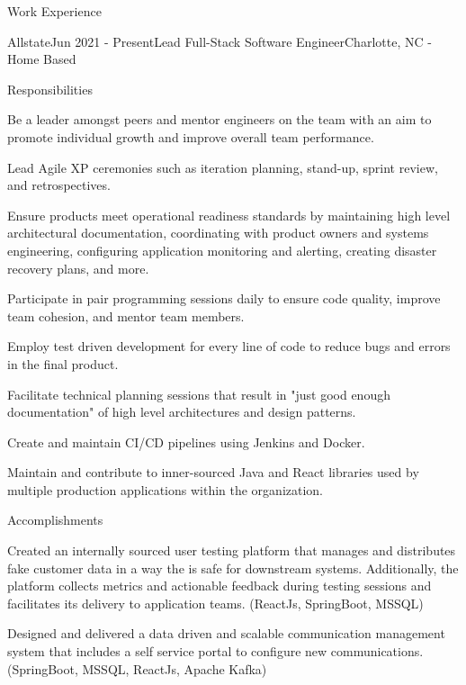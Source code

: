 \documentclass{resume}
\begin{document}
    \begin{basicSection}{Work Experience}
        \begin{workExperienceSection}{Allstate}{Jun 2021 - Present}{Lead Full-Stack Software Engineer}{Charlotte, NC - Home Based}
            \begin{workExperienceSectionSubSection}{Responsibilities}
                \item Be a leader amongst peers and mentor engineers on the team with an aim to promote individual growth and improve overall team performance.
                \item Lead Agile XP ceremonies such as iteration planning, stand-up, sprint review, and retrospectives.
                \item Ensure products meet operational readiness standards by maintaining high level architectural documentation, coordinating with product owners and systems engineering, configuring application monitoring and alerting, creating disaster recovery plans, and more.
                \item Participate in pair programming sessions daily to ensure code quality, improve team cohesion, and mentor team members.
                \item Employ test driven development for every line of code to reduce bugs and errors in the final product.
                \item Facilitate technical planning sessions that result in "just good enough documentation" of high level architectures and design patterns.
                \item Create and maintain CI/CD pipelines using Jenkins and Docker.
                \item Maintain and contribute to inner-sourced Java and React libraries used by multiple production applications within the organization.
            \end{workExperienceSectionSubSection}
            \begin{workExperienceSectionSubSection}{Accomplishments}
                \item Created an internally sourced user testing platform that manages and distributes fake customer data in a way the is safe for downstream systems.
                Additionally, the platform collects metrics and actionable feedback during testing sessions and facilitates its delivery to application teams. (ReactJs, SpringBoot, MSSQL)
                \item Designed and delivered a data driven and scalable communication management system that includes a self service portal to configure new communications. (SpringBoot, MSSQL, ReactJs, Apache Kafka)

\end{workExperienceSectionSubSection}
\end{workExperienceSection}
\end{basicSection}
\end{document}
